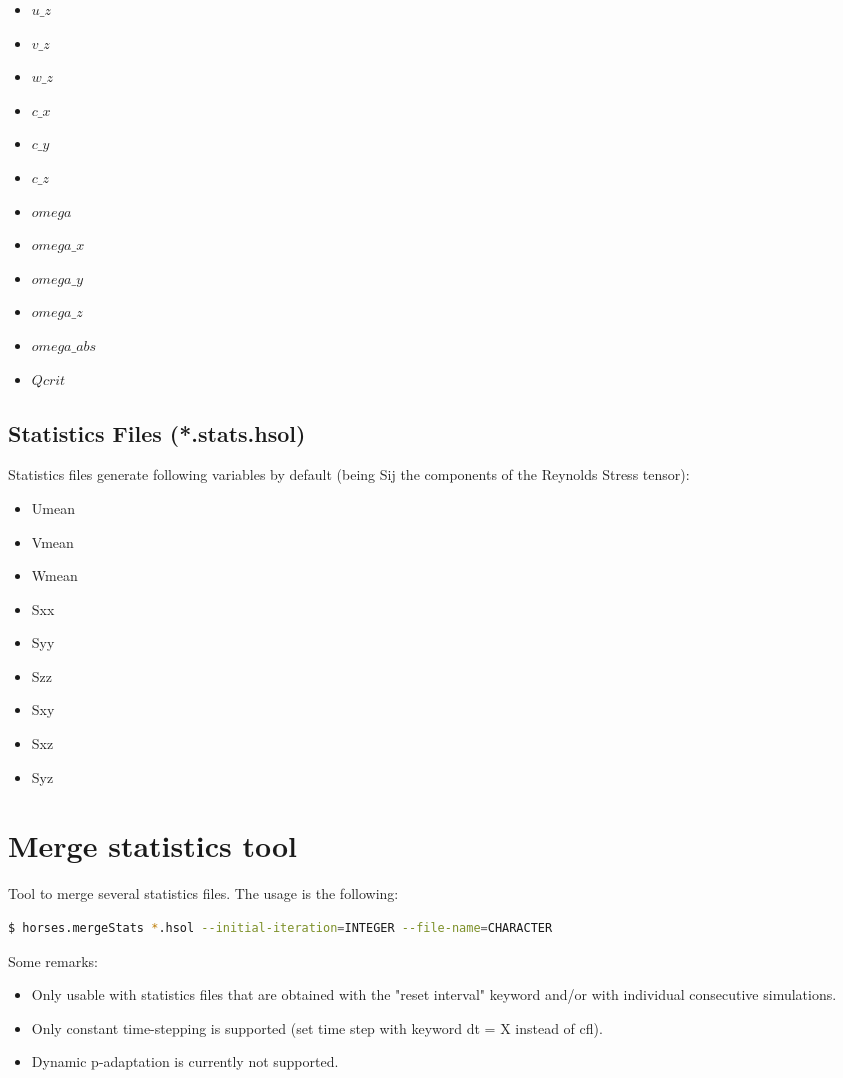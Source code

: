\documentclass[a4paper,10pt]{report}
\begin{document}
\begin{multicols}{5}
\begin{itemize}
\item $u\_z$
\item $v\_z$
\item $w\_z$
\item $c\_x$
\item $c\_y$
\item $c\_z$
\item $omega$
\item $omega\_x$
\item $omega\_y$
\item $omega\_z$
\item $omega\_abs$
\item $Qcrit$
\end{itemize}
\end{multicols}

\subsection{Statistics Files (*.stats.hsol)}
Statistics files generate following variables by default (being Sij the components of the Reynolds Stress tensor):

\begin{multicols}{3}
\begin{itemize}
\item Umean
\item Vmean
\item Wmean
\item Sxx
\item Syy
\item Szz
\item Sxy
\item Sxz
\item Syz
\end{itemize}
\end{multicols}

\section{Merge statistics tool}

Tool to merge several statistics files. The usage is the following:

\begin{lstlisting}[language=bash]
	$ horses.mergeStats *.hsol --initial-iteration=INTEGER --file-name=CHARACTER
\end{lstlisting}

Some remarks:
\begin{itemize}
\item Only usable with statistics files that are obtained with the "reset interval" keyword and/or with individual consecutive simulations. 
\item Only constant time-stepping is supported (set time step with keyword dt = X instead of cfl).
\item Dynamic p-adaptation is currently not supported.
\end{itemize}
\end{document}
